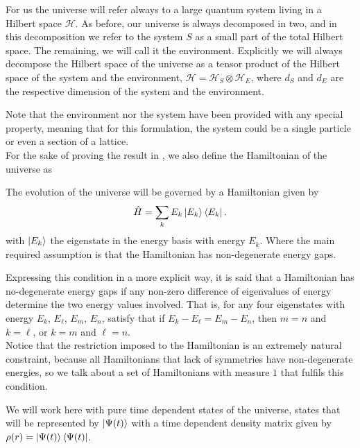\begin{definition} For us the universe will refer always to a large quantum system living in a Hilbert space $\mathcal{H}$. As before, our universe is always decomposed in two,  and in this decomposition we refer to the system $S$ as a small part of the total Hilbert space. The remaining, we will call it the environment. Explicitly we will always decompose the Hilbert space of the universe as a tensor product of the Hilbert space of the system and the environment, $\mathcal{H}=\mathcal{H}_S\otimes \mathcal{H}_E$, where $d_S$ and $d_E$ are the respective dimension of the system and the environment. 
\end{definition}
Note that  the environment nor the system have been provided with any special property, meaning that for this formulation, the system could be a single particle or even a section of a lattice.\\
\indent For the sake of proving the result in \cite{linden_quantum_2009}, we also define the Hamiltonian of the universe as
\begin{definition}[Hamiltonian:]
The evolution of the universe will be governed by a Hamiltonian given by
\begin{equation}
\hat{H}=\sum_{k}E_k\mathinner{|{E_k}\rangle}\mathinner{\langle{E_k}|}.
\label{CH1:Hamiltonian_universe_linden}
\end{equation}
with $\mathinner{|{E_k}\rangle}$ the eigenstate in the energy basis with energy $E_k$. Where the main required assumption is that the Hamiltonian has non-degenerate energy gaps.
\end{definition}
Expressing this condition in a more  explicit way, it is said that a Hamiltonian has no-degenerate energy gaps if any non-zero difference of eigenvalues of energy determine the two energy values involved. That is, for any four eigenstates with energy $E_k$, $E_\ell$, $E_m$, $E_n$, satisfy that if $E_{k}-E_{\ell}=E_{m}-E_{n}$, then $m=n$ and $k=\ell$, or $k=m$ and $\ell = n$. \\
\indent Notice that the restriction imposed to the Hamiltonian is an extremely natural constraint, because all Hamiltonians that lack of symmetries have non-degenerate energies, so we talk about a set of Hamiltonians with measure $1$ that fulfils this condition.\\
\begin{definition}[Notation:]
We will work here with pure time dependent states of the universe, states that will be represented by $\mathinner{|{\Psi(t)}\rangle}$ with a time dependent density matrix given by $\rho(r) =\mathinner{|{\Psi(t)}\rangle}\mathinner{\langle{\Psi(t)}|}$. 
\end{definition}
